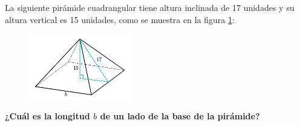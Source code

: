 \question[15]  La siguiente pirámide cuadrangular tiene altura inclinada de 17 unidades y
su altura vertical es 15 unidades, como se muestra en la figura \ref{fig:pitagoras3D_piram_01}:\\
\begin{figure}[H]
    \begin{center}
        \includegraphics[width=0.4\textwidth]{../images/pitagoras3D_piram_01.png}
    \end{center}
    \caption{}
    \label{fig:pitagoras3D_piram_01}
\end{figure}
\textbf{¿Cuál es la longitud $b$ de un lado de la base de la pirámide?}\\